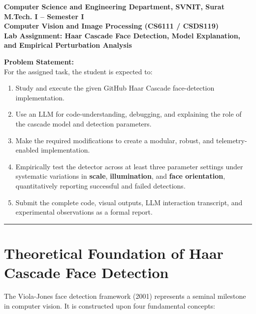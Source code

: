 \documentclass[12pt]{article}
\begin{document}
\begin{center}
\textbf{Computer Science and Engineering Department, SVNIT, Surat}\\
\textbf{M.Tech. I -- Semester I}\\
\textbf{Computer Vision and Image Processing (CS6111 / CSDS119)}\\
\textbf{Lab Assignment: Haar Cascade Face Detection, Model Explanation, and Empirical Perturbation Analysis}
\end{center}

\vspace{0.2cm}

\textbf{Problem Statement:} \\
For the assigned task, the student is expected to:
\begin{enumerate}
    \item Study and execute the given GitHub Haar Cascade face-detection implementation.
    \item Use an LLM for code-understanding, debugging, and explaining the role of the cascade model and detection parameters.
    \item Make the required modifications to create a modular, robust, and telemetry-enabled implementation.
    \item Empirically test the detector across at least three parameter settings under systematic variations in \textbf{scale}, \textbf{illumination}, and \textbf{face orientation}, quantitatively reporting successful and failed detections.
    \item Submit the complete code, visual outputs, LLM interaction transcript, and experimental observations as a formal report.
\end{enumerate}

\vspace{0.2cm}
\hrule
\vspace{0.2cm}

\section{Theoretical Foundation of Haar Cascade Face Detection}

The Viola-Jones face detection framework (2001) represents a seminal milestone in computer vision. It is constructed upon four fundamental concepts:
\end{document}
